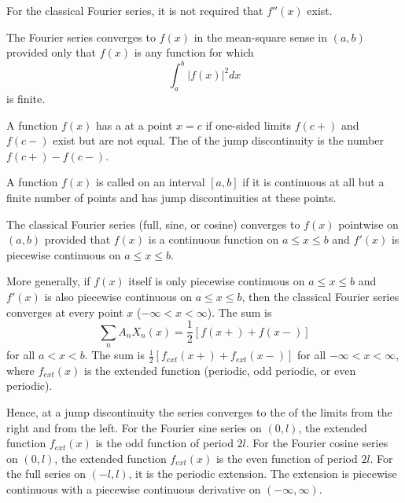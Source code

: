 For the classical Fourier series, it is not required that $f''(x)$ exist.

\begin{theorem}
    The Fourier series converges to $f(x)$ in the mean-square sense in $(a,b)$ provided only that $f(x)$ is any function for which \begin{equation*}
        \int_a^b|f(x)|^2dx
    \end{equation*}
    is finite.
\end{theorem}

\begin{definition}
    A function $f(x)$ has a  at a point $x =c$ if one-sided limits $f(c+)$ and $f(c-)$ exist but are not equal. The  of the jump discontinuity is the number $f(c+) - f(c-)$.
\end{definition}

\begin{definition}
    A function $f(x)$ is called  on an interval $[a,b]$ if it is continuous at all but a finite number of points and has jump discontinuities at these points.
\end{definition}

\begin{theorem}
    The classical Fourier series (full, sine, or cosine) converges to $f(x)$ pointwise on $(a,b)$ provided that $f(x)$ is a continuous function on $a \leq x \leq b$ and $f'(x)$ is piecewise continuous on $a \leq x \leq b$.


    More generally, if $f(x)$ itself is only piecewise continuous on $a \leq x \leq b$ and $f'(x)$ is also piecewise continuous on $a \leq x \leq b$, then the classical Fourier series converges at every point $x$ ($-\infty < x < \infty$). The sum is \begin{equation*}
        \sum_nA_nX_n(x) = \frac{1}{2}[f(x+)+f(x-)]
    \end{equation*}
    for all $a < x < b$. The sum is $\frac{1}{2}[f_{ext}(x+)+f_{ext}(x-)]$ for all $-\infty < x < \infty$, where $f_{ext}(x)$ is the extended function (periodic, odd periodic, or even periodic).
\end{theorem}

Hence, at a jump discontinuity the series converges to the  of the limits from the right and from the left. For the Fourier sine series on $(0,l)$, the extended function $f_{ext}(x)$ is the odd function of period $2l$. For the Fourier cosine series on $(0,l)$, the extended function $f_{ext}(x)$ is the even function of period $2l$. For the full series on $(-l,l)$, it is the periodic extension. The extension is piecewise continuous with a piecewise continuous derivative on $(-\infty, \infty)$.


